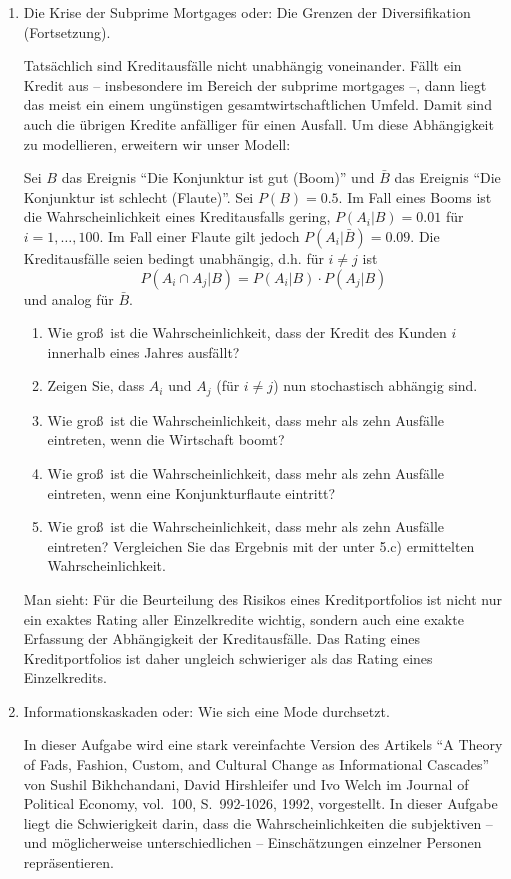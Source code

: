 \begin{enumerate}
\item Die Krise der Subprime Mortgages oder: Die Grenzen der Diversifikation
(Fortsetzung).

Tats\"{a}chlich sind Kreditausf\"{a}lle nicht unabh\"{a}ngig voneinander. 
Fällt ein Kredit aus -- insbesondere im Bereich der subprime mortgages
--, dann liegt das meist ein einem ung\"{u}nstigen gesamtwirtschaftlichen
Umfeld. Damit sind auch die \"{u}brigen Kredite anf\"{a}lliger f\"{u}r einen
Ausfall. Um diese Abh\"{a}ngigkeit zu modellieren, erweitern wir unser
Modell:

Sei $B$ das Ereignis "`Die Konjunktur ist gut (Boom)"' und $\bar{B}$ das 
Ereignis "`Die Konjunktur ist schlecht (Flaute)"'. Sei $P(B)=0.5$. Im Fall
eines Booms ist die Wahrscheinlichkeit eines Kreditausfalls gering, 
$P(A_{i}|B)=0.01$ f\"{u}r $i=1,\ldots ,100$. Im Fall einer Flaute gilt jedoch 
$P(A_{i}|\bar{B})=0.09$. Die Kreditausf\"{a}lle seien bedingt 
unabhängig, d.h. f\"{u}r $i\neq j$ ist
\[ P(A_{i}\cap A_{j}|B)=P(A_{i}|B)\cdot P(A_{j}|B) \]
und analog f\"{u}r $\bar{B}$.
\begin{enumerate}
\item Wie gro\ss\ ist die Wahrscheinlichkeit, dass der Kredit des Kunden $i$
innerhalb eines Jahres ausf\"{a}llt?
\item Zeigen Sie, dass $A_{i}$ und $A_{j}$ (f\"{u}r $i\neq j$) nun
stochastisch abh\"{a}ngig sind.
\item Wie gro\ss\ ist die Wahrscheinlichkeit, dass mehr als zehn Ausfälle 
eintreten, wenn die Wirtschaft boomt?
\item Wie gro\ss\ ist die Wahrscheinlichkeit, dass mehr als zehn 
Ausfälle eintreten, wenn eine Konjunkturflaute eintritt?
\item Wie gro\ss\ ist die Wahrscheinlichkeit, dass mehr als zehn 
Ausfälle eintreten? Vergleichen Sie das Ergebnis mit der unter 5.c) ermittelten
Wahrscheinlichkeit.
\end{enumerate}
Man sieht: F\"{u}r die Beurteilung des Risikos eines Kreditportfolios ist
nicht nur ein exaktes Rating aller Einzelkredite wichtig, sondern auch eine
exakte Erfassung der Abh\"{a}ngigkeit der Kreditausf\"{a}lle. Das Rating
eines Kreditportfolios ist daher ungleich schwieriger als das Rating eines
Einzelkredits.

\item Informationskaskaden oder: Wie sich eine Mode durchsetzt.

In dieser Aufgabe wird eine stark vereinfachte Version des Artikels
"`A Theory of Fads, Fashion, Custom, and Cultural Change as 
Informational Cascades"' von Sushil Bikhchandani, David
Hirshleifer und Ivo Welch im Journal of Political Economy, vol.~100, 
S.~992-1026, 1992, vorgestellt. In
dieser Aufgabe liegt die Schwierigkeit darin, dass die Wahrscheinlichkeiten
die subjektiven -- und m\"{o}glicherweise unterschiedlichen -- Einschätzungen 
einzelner Personen repr\"{a}sentieren.


\end{enumerate}
